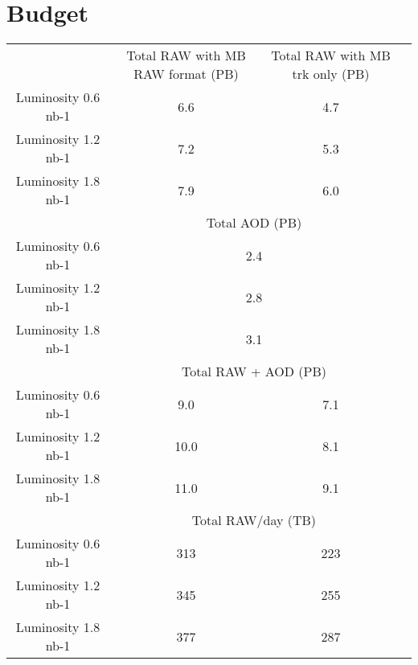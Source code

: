 \section{Budget}
\label{sec:funding}

\begin{center}
\begin{tabular}{ |c|c|c|c|} 




\hline
&  Total RAW with MB RAW format (PB) &  Total RAW with MB trk only (PB)\\
Luminosity 0.6 nb-1 & 6.6 & 4.7 \\
Luminosity 1.2 nb-1 & 7.2 & 5.3 \\ 
Luminosity 1.8 nb-1 & 7.9 & 6.0 \\                 
\hline
& \multicolumn{2}{c|}{Total AOD (PB)}\\
Luminosity 0.6 nb-1 & \multicolumn{2}{c|}{2.4} \\
Luminosity 1.2 nb-1 & \multicolumn{2}{c|}{2.8} \\ 
Luminosity 1.8 nb-1 & \multicolumn{2}{c|}{3.1} \\
\hline
&  \multicolumn{2}{c|}{Total RAW + AOD (PB)}\\
Luminosity 0.6 nb-1 & 9.0 & 7.1 \\
Luminosity 1.2 nb-1 & 10.0 & 8.1 \\ 
Luminosity 1.8 nb-1 & 11.0 & 9.1 \\   
\hline 
&  \multicolumn{2}{c|}{Total RAW/day (TB)}\\
Luminosity 0.6 nb-1 & 313 & 223 \\
Luminosity 1.2 nb-1 & 345 & 255 \\ 
Luminosity 1.8 nb-1 & 377 & 287 \\   
\hline 
\end{tabular}
\end{center}